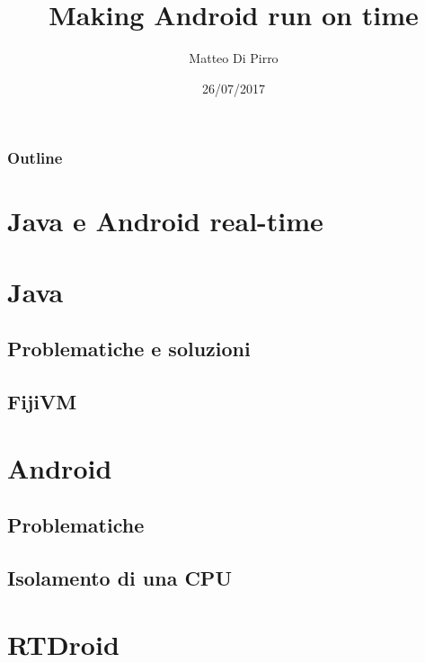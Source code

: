 \documentclass{beamer}
\title{Making Android run on time}
\subtitle{ }
\author{Matteo Di Pirro}
\date{26/07/2017}
\institute{Università degli Studi di Padova}
\begin{document}
\newcommand{\turnOffNumbers}{true} %

\begin{frame}[noframenumbering]
\titlepage
\end{frame}

\let\turnOffNumbers\empty
\begin{frame}
	\frametitle{Outline}
	\tableofcontents
\end{frame}

\section{Java e Android real-time}


\section{Java}
\subsection{Problematiche e soluzioni}


\subsection{FijiVM}




\section{Android}
\subsection{Problematiche}



\subsection{Isolamento di una CPU}


\section{RTDroid}

\appendix
\makethanks
\renewcommand{\turnOffNumbers}{true} %
\end{document}
